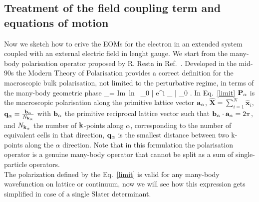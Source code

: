 \subsection{Treatment of the field coupling term and equations of motion}\label{ss:fldcpl}
Now we sketch how to erive the EOMs for the electron in an extended system coupled with an external electric field in lenght gauge. We start from the many-body polarisation operator proposed by R. Resta in Ref.~\cite{PhysRevLett.80.1800}.
Developed in the mid-90s the Modern Theory of Polarisation\cite{RevModPhys.66.899} provides a correct definition for the macroscopic bulk polarisation, not limited to the perturbative regime, in terms of the many-body geometric phase 
\be 
\PP_\alpha =   \mbox{Im ln }  \langle \Psi_0 | {\rm e}^{i \qq_\alpha \cdot {}} | \Psi_0 \rangle . \label{limit} 
\ee
In Eq.~\eqref{limit} ${\bf P}_\alpha$ is the macroscopic polarisation along the primitive lattice vector ${\bf a}_\alpha$, $\hat{\mathbf X} = \sum_{i=1}^{N} \hat{\mathbf x}_i$, ${\bf q}_\alpha = \frac{{\bf b}_\alpha}{N_{{\bf k}_\alpha}}$ with ${\bf b}_\alpha$ the primitive reciprocal lattice vector such that ${\bf b}_\alpha\cdot{\bf a}_\alpha=2\pi$, and $N_{{\bf k}_\alpha}$ the number of ${\bf k}$-points along $\alpha$, corresponding to the number of equivalent cells in that direction, ${\bf q}_\alpha$ is the smallest distance between two k-points along the $\alpha$ direction.
Note that in this formulation the polarisation operator is a genuine many-body operator that cannot be split as a sum of single-particle operators. \\
The polarization defined by the Eq.~\ref{limit} is valid for any many-body wavefunction on lattice or continuum\cite{PhysRevLett.80.1800,resta1999electron}, now we will see how this expression gets simplified in case of a single Slater determinant.



